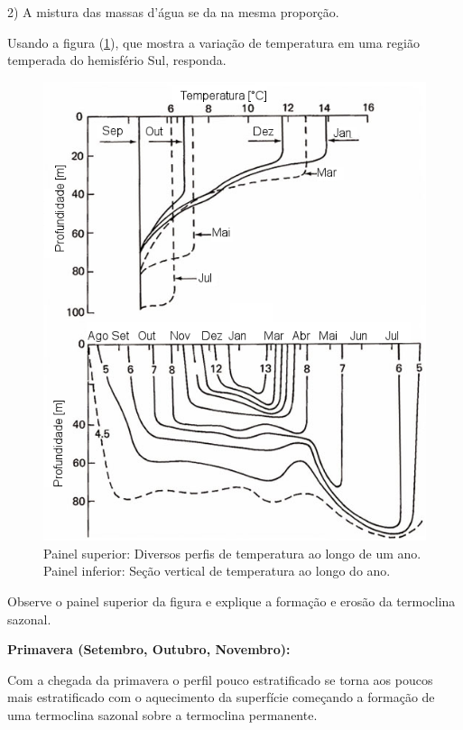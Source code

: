 \documentclass[letterpaper,portuguese,12pt,pdftex]{exam}
\begin{document}
\begin{questions}
\begin{parts}
\begin{solution}
  2) A mistura das massas d'água se da  na mesma proporção.
  \end{solution}

 \end{parts}

\question[2]
Usando a figura (\ref{fig:termo}), que mostra a variação de temperatura em
uma região temperada do hemisfério Sul, responda.

\begin{figure}[ht]
  \centering
  \includegraphics{./figures/termoclina_sazonal.png}
  \caption{Painel superior: Diversos perfis de temperatura ao longo de um ano.
           Painel inferior: Seção vertical de temperatura ao longo do ano.}
  \label{fig:termo}
\end{figure}

  Observe o painel superior da figura e explique a formação e erosão da
  termoclina sazonal.

  \begin{solution}
  {\bf Primavera (Setembro, Outubro, Novembro):}

  Com a chegada da primavera o perfil pouco estratificado se torna aos poucos
  mais estratificado com o aquecimento da superfície começando a formação de uma
  termoclina sazonal sobre a termoclina permanente.


\end{solution}
\end{questions}
\end{document}

